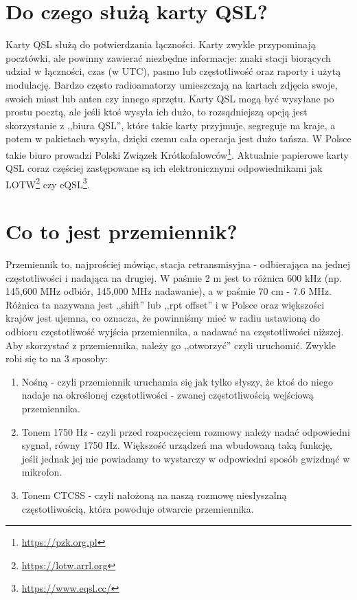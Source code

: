 \documentclass[a4paper,12pt]{article}
\begin{document}
\section{Do czego służą karty QSL?}
Karty QSL służą do potwierdzania łączności. Karty zwykle przypominają pocztówki, ale powinny zawierać niezbędne informacje: znaki stacji biorących udział w łączności, czas (w UTC), pasmo lub częstotliwość oraz raporty i użytą modulację. Bardzo często radioamatorzy umieszczają na kartach zdjęcia swoje, swoich miast lub anten czy innego sprzętu. Karty QSL mogą być wysyłane po prostu pocztą, ale jeśli ktoś wysyła ich dużo, to rozsądniejszą opcją jest skorzystanie z ,,biura QSL'', które takie karty przyjmuje, segreguje na kraje, a potem w pakietach wysyła, dzięki czemu cała operacja jest dużo tańsza. W Polsce takie biuro prowadzi Polski Związek Krótkofalowców\footnote{\url{https://pzk.org.pl}}. Aktualnie papierowe karty QSL coraz częściej zastępowane są ich elektronicznymi odpowiednikami jak LOTW\footnote{\url{https://lotw.arrl.org}} czy eQSL\footnote{\url{https://www.eqsl.cc/}}. 

\section{Co to jest przemiennik?}
Przemiennik to, najprościej mówiąc, stacja retransmisyjna - odbierająca na jednej częstotliwości i nadająca na drugiej. W paśmie 2 m jest to różnica 600 kHz (np. 145,600 MHz odbiór, 145,000 MHz nadawanie), a w paśmie 70 cm - 7.6 MHz. Różnica ta nazywana jest ,,shift'' lub ,,rpt offset'' i w Polsce oraz większości krajów jest ujemna, co oznacza, że powinniśmy mieć w radiu ustawioną do odbioru częstotliwość wyjścia przemiennika, a nadawać na częstotliwości niższej. Aby skorzystać z przemiennika, należy go ,,otworzyć'' czyli uruchomić. Zwykle robi się to na 3 sposoby:

\begin{enumerate}
 \item Nośną - czyli przemiennik uruchamia się jak tylko słyszy, że ktoś do niego nadaje na określonej częstotliwości - zwanej częstotliwością wejściową przemiennika.
 \item Tonem 1750 Hz - czyli przed rozpoczęciem rozmowy należy nadać odpowiedni sygnał, równy 1750 Hz. Większość urządzeń ma wbudowaną taką funkcję, jeśli jednak jej nie powiadamy to wystarczy w odpowiedni sposób gwizdnąć w mikrofon.
 \item Tonem CTCSS - czyli nałożoną na naszą rozmowę niesłyszalną częstotliwością, która powoduje otwarcie przemiennika.
\end{enumerate}
\end{document}
